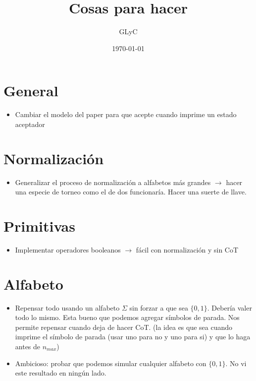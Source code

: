 \documentclass{article}
\title{Cosas para hacer}
\author{GLyC}
\date{\today}
\begin{document}
\maketitle


\section{General}

\begin{itemize}
    \item Cambiar el modelo del paper para que acepte cuando imprime un estado aceptador
\end{itemize}




\section{Normalización}

\begin{itemize}
    \item Generalizar el proceso de normalización a alfabetos más grandes $\rightarrow$ hacer una especie de torneo como el de dos funcionaría. Hacer una suerte de llave.
\end{itemize}




\section{Primitivas}

\begin{itemize}
    \item Implementar operadores booleanos $\rightarrow$ fácil con normalización y sin CoT
\end{itemize}


\section{Alfabeto}

\begin{itemize}
    \item Repensar todo usando un alfabeto $\Sigma$ sin forzar a que sea $\{0,1\}$. Debería valer todo lo mismo. Esta bueno que podemos agregar símbolos de parada. Nos permite repensar cuando deja de hacer CoT. (la idea es que sea cuando imprime el símbolo de parada (usar uno para no y uno para si) y que lo haga antes de $n_{max}$)
    \item Ambicioso: probar que podemos simular cualquier alfabeto con $\{0,1\}$. No vi este resultado en ningún lado.
\end{itemize}
\end{document}
